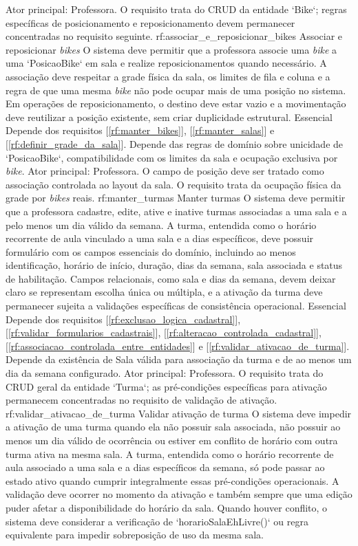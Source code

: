 {Ator principal: Professora. O requisito trata do CRUD da entidade `Bike`; regras específicas de posicionamento e reposicionamento devem permanecer concentradas no requisito seguinte.}
\reqfuncfull
{rf:associar_e_reposicionar_bikes}
{Associar e reposicionar \textit{bikes}}
{O sistema deve permitir que a professora associe uma \textit{bike} a uma `PosicaoBike` em sala e realize reposicionamentos quando necessário. A associação deve respeitar a grade física da sala, os limites de fila e coluna e a regra de que uma mesma \textit{bike} não pode ocupar mais de uma posição no sistema. Em operações de reposicionamento, o destino deve estar vazio e a movimentação deve reutilizar a posição existente, sem criar duplicidade estrutural.}
{Essencial}
{Depende dos requisitos [\ref{rf:manter_bikes}], [\ref{rf:manter_salas}] e [\ref{rf:definir_grade_da_sala}]. Depende das regras de domínio sobre unicidade de `PosicaoBike`, compatibilidade com os limites da sala e ocupação exclusiva por \textit{bike}.}
{Ator principal: Professora. O campo de posição deve ser tratado como associação controlada ao layout da sala. O requisito trata da ocupação física da grade por \textit{bikes} reais.}
\reqfuncfull
{rf:manter_turmas}
{Manter turmas}
{O sistema deve permitir que a professora cadastre, edite, ative e inative turmas associadas a uma sala e a pelo menos um dia válido da semana. A turma, entendida como o horário recorrente de aula vinculado a uma sala e a dias específicos, deve possuir formulário com os campos essenciais do domínio, incluindo ao menos identificação, horário de início, duração, dias da semana, sala associada e status de habilitação. Campos relacionais, como sala e dias da semana, devem deixar claro se representam escolha única ou múltipla, e a ativação da turma deve permanecer sujeita a validações específicas de consistência operacional.}
{Essencial}
{Depende dos requisitos [\ref{rf:exclusao_logica_cadastral}], [\ref{rf:validar_formularios_cadastrais}], [\ref{rf:alteracao_controlada_cadastral}], [\ref{rf:associacao_controlada_entre_entidades}] e [\ref{rf:validar_ativacao_de_turma}]. Depende da existência de Sala válida para associação da turma e de ao menos um dia da semana configurado.}
{Ator principal: Professora. O requisito trata do CRUD geral da entidade `Turma`; as pré-condições específicas para ativação permanecem concentradas no requisito de validação de ativação.}
\reqfuncfull
{rf:validar_ativacao_de_turma}
{Validar ativação de turma}
{O sistema deve impedir a ativação de uma turma quando ela não possuir sala associada, não possuir ao menos um dia válido de ocorrência ou estiver em conflito de horário com outra turma ativa na mesma sala. A turma, entendida como o horário recorrente de aula associado a uma sala e a dias específicos da semana, só pode passar ao estado ativo quando cumprir integralmente essas pré-condições operacionais. A validação deve ocorrer no momento da ativação e também sempre que uma edição puder afetar a disponibilidade do horário da sala. Quando houver conflito, o sistema deve considerar a verificação de `horarioSalaEhLivre()` ou regra equivalente para impedir sobreposição de uso da mesma sala.}
